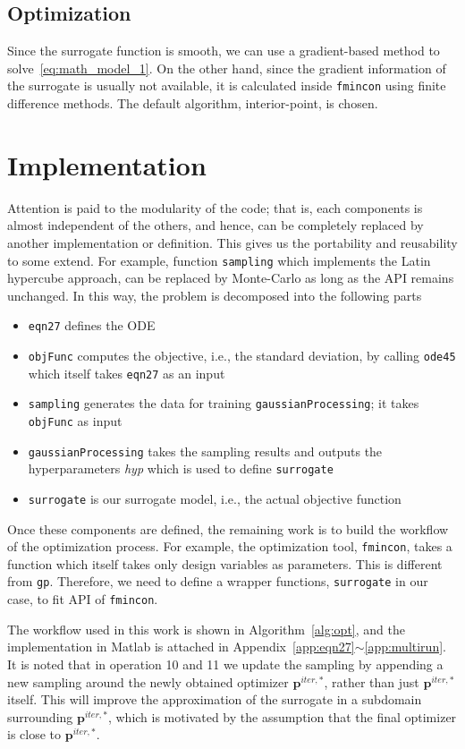 \documentclass[a4paper]{article}
\makeatletter
\newcommand{\ie}[0]{{i.e.\@}\xspace}
\makeatother
\begin{document}
\subsection{Optimization}
Since the surrogate function is smooth, we can use a gradient-based method to solve~\eqref{eq:math_model_1}. On the other hand, since the gradient information of the surrogate is usually not available, it is calculated inside \texttt{fmincon} using finite difference methods. The default algorithm, interior-point, is chosen.

\section{Implementation}

Attention is paid to the modularity of the code; that is, each components is almost independent of the others, and hence, can be completely replaced by another implementation or definition. This gives us the portability and reusability to some extend. For example, function \texttt{sampling} which implements the Latin hypercube approach, can be replaced by Monte-Carlo as long as the API remains unchanged.  In this way, the problem is decomposed into the following parts
\begin{itemize}
  \item \texttt{eqn27} defines the ODE
  \item \texttt{objFunc} computes the objective, \ie, the standard deviation, by calling \texttt{ode45} which itself takes \texttt{eqn27} as an input
  \item \texttt{sampling} generates the data for training \texttt{gaussianProcessing}; it takes \texttt{objFunc} as input
  \item \texttt{gaussianProcessing} takes the sampling results and outputs the hyperparameters \textit{hyp} which is used to define \texttt{surrogate}
  \item \texttt{surrogate} is our surrogate model, \ie, the actual objective function
\end{itemize}

Once these components are defined, the remaining work is to build the workflow of the optimization process. For example, the optimization tool, \texttt{fmincon}, takes a function which itself takes only design variables as parameters. This is different from \texttt{gp}. Therefore, we need to define a wrapper functions, \texttt{surrogate} in our case, to fit API of \texttt{fmincon}.

The workflow used in this work is shown in Algorithm~\ref{alg:opt}, and the implementation in Matlab is attached in Appendix~\ref{app:eqn27}$\sim$\ref{app:multirun}. It is noted that in operation 10 and 11 we update the sampling by appending a new sampling around the newly obtained optimizer $\bm{p}^{iter, *}$, rather than just $\bm{p}^{iter, *}$ itself. This will improve the approximation of the surrogate in a subdomain surrounding $\bm{p}^{iter, *}$, which is motivated by the assumption that the final optimizer is close to $\bm{p}^{iter, *}$.
\end{document}
